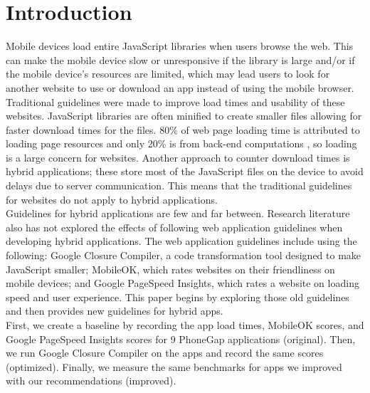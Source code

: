 \documentclass{acm_proc_article-sp}
\begin{document}



\section{Introduction}
Mobile devices load entire JavaScript libraries when users browse the web.
This can make the mobile device slow or unresponsive if the library is large and/or if the mobile device’s resources are limited, which may lead users to look for another website to use or download an app instead of using the mobile browser.
Traditional guidelines were made to improve load times and usability of these websites.
JavaScript libraries are often minified to create smaller files allowing for faster download times for the files.
80\% of web page loading time is attributed to loading page resources and only 20\% is from back-end computations \cite{souders2008high}, so loading is a large concern for websites.
Another approach to counter download times is hybrid applications; these store most of the JavaScript files on the device to avoid delays due to server communication.
This means that the traditional guidelines for websites do not apply to hybrid applications.\\
Guidelines for hybrid applications are few and far between. Research literature also has not explored the effects of following web application guidelines when developing hybrid applications. 
The web application guidelines include using the following: Google Closure Compiler, a code transformation tool designed to make JavaScript smaller; MobileOK, which rates websites on their friendliness on mobile devices; and Google PageSpeed Insights, which rates a website on loading speed and user experience. 
This paper begins by exploring those old guidelines and then provides new guidelines for hybrid apps.\\
First, we create a baseline by recording the app load times, MobileOK scores, and Google PageSpeed Insights scores for 9 PhoneGap applications (original). 
Then, we run Google Closure Compiler on the apps and record the same scores (optimized). 
Finally, we measure the same benchmarks for apps we improved with our recommendations (improved).
\end{document}
